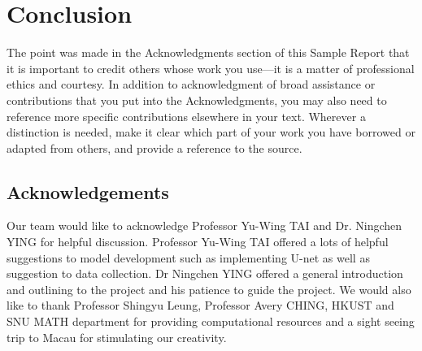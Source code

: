 \chapter{Conclusion}\label{Ch:GivingCredit}

The point was made in the Acknowledgments section of this Sample Report that it is important to credit others whose work you use---it is a matter of professional ethics and courtesy. 
In addition to acknowledgment of broad assistance or contributions that you put into the Acknowledgments, you may also need to reference more specific contributions elsewhere in your text.
Wherever a distinction is needed, make it clear which part of your work you have borrowed or adapted from others, and provide a reference to the source. 

\section{Acknowledgements}

Our team would like to acknowledge Professor Yu-Wing TAI and Dr. Ningchen YING for helpful discussion. Professor Yu-Wing TAI offered a lots of helpful suggestions to model development such as implementing U-net as well as suggestion to data collection. Dr Ningchen YING offered a general introduction and outlining to the project and his patience to guide the project. We would also like to thank Professor Shingyu Leung, Professor Avery CHING, HKUST and SNU MATH department for providing computational resources and a sight seeing trip to Macau for stimulating our creativity. 

\endinput
